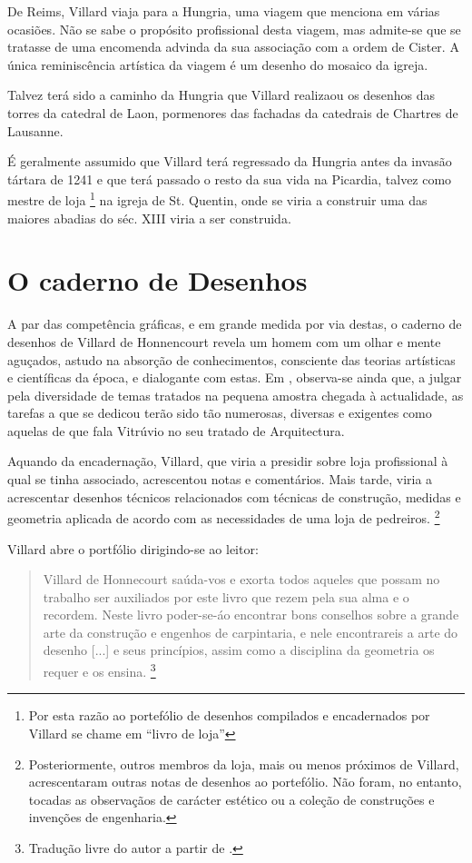 \documentclass{article}
\begin{document}
De Reims, Villard viaja para a Hungria, uma viagem que menciona em
várias ocasiões. Não se sabe o propósito profissional desta viagem,
mas admite-se que se tratasse de uma encomenda advinda da sua
associação com a ordem de Cister. A única reminiscência artística da
viagem é um desenho do mosaico da igreja.

Talvez terá sido a caminho da Hungria que Villard realizaou os
desenhos das torres da catedral de Laon, pormenores das fachadas da
catedrais de Chartres de Lausanne.

É geralmente assumido \cite{teresa} que Villard terá regressado da
Hungria antes da invasão tártara de 1241 e que terá passado o resto da
sua vida na Picardia, talvez como mestre de loja \footnote{Por esta
  razão ao portefólio de desenhos compilados e encadernados por
  Villard se chame em \cite{teresa} ``livro de loja''} na
igreja de St. Quentin, onde se viria a construir uma das maiores
abadias do séc. XIII viria a ser construida.

\section{O caderno de Desenhos}

A par das competência gráficas, e em grande medida por via destas, o
caderno de desenhos de Villard de Honnencourt revela um homem com um
olhar e mente aguçados, astudo na absorção de conhecimentos,
consciente das teorias artísticas e científicas da época, e dialogante
com estas. Em \cite{teresa}, observa-se ainda que, a julgar pela
diversidade de temas tratados na pequena amostra chegada à
actualidade, as tarefas a que se dedicou terão sido tão numerosas,
diversas e exigentes como aquelas de que fala Vitrúvio no seu tratado
de Arquitectura.

Aquando da encadernação, Villard, que viria a presidir sobre loja
profissional à qual se tinha associado, acrescentou notas e
comentários. Mais tarde, viria a acrescentar desenhos técnicos
relacionados com técnicas de construção, medidas e geometria aplicada
de acordo com as necessidades de uma loja de
pedreiros. \footnote{Posteriormente, outros membros da loja, mais ou
  menos próximos de Villard, acrescentaram outras notas de desenhos ao
  portefólio. Não foram, no entanto, tocadas as observaçãos de
  carácter estético ou a coleção de construções e invenções de
  engenharia.}

Villard abre o portfólio dirigindo-se ao leitor:

\begin{quote} Villard de Honnecourt saúda-vos e exorta todos aqueles
que possam no trabalho ser auxiliados por este livro que rezem pela
sua alma e o recordem. Neste livro poder-se-áo encontrar bons
conselhos sobre a grande arte da construção e engenhos de carpintaria,
e nele encontrareis a arte do desenho [...] e seus princípios, assim
como a disciplina da geometria os requer e os
ensina. \footnote{Tradução livre do autor a partir de \cite{teresa}.}
\end{quote}
\end{document}
